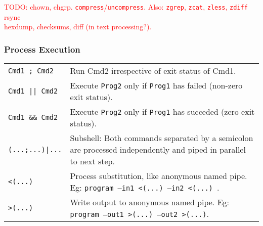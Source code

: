 \textcolor{red}{TODO: chown, chgrp.}
\textcolor{red}{\texttt{compress}/\texttt{uncompress}. Also: \texttt{zgrep}, \texttt{zcat}, \texttt{zless}, \texttt{zdiff}}
\textcolor{red}{rsync}\\
\textcolor{red}{hexdump, checksums, diff (in text processing?).}\\

\subsubsection{Process Execution}

\begin{tabularx}{\linewidth}{lX}

    \texttt{Cmd1 ; Cmd2}        & Run Cmd2 irrespective of exit status of Cmd1.\\
    \texttt{Cmd1 || Cmd2}       & Execute \texttt{Prog2} only if \texttt{Prog1} has failed (non-zero exit status).\\
    \texttt{Cmd1 \&\& Cmd2}     & Execute \texttt{Prog2} only if \texttt{Prog1} has succeded (zero exit status).\\
    \texttt{(...;...)|...}      & Subshell: Both commands separated by a semicolon are processed independently and piped in parallel to next step. \\
    \texttt{<(...)}             & Process substitution, like anonymous named pipe. Eg: \texttt{program --in1 <(...) --in2 <(...) }.\\
    \texttt{>(...)}             & Write output to anonymous named pipe. Eg: \texttt{program --out1 >(...) --out2 >(...)}.\\
    \hline

\end{tabularx}


